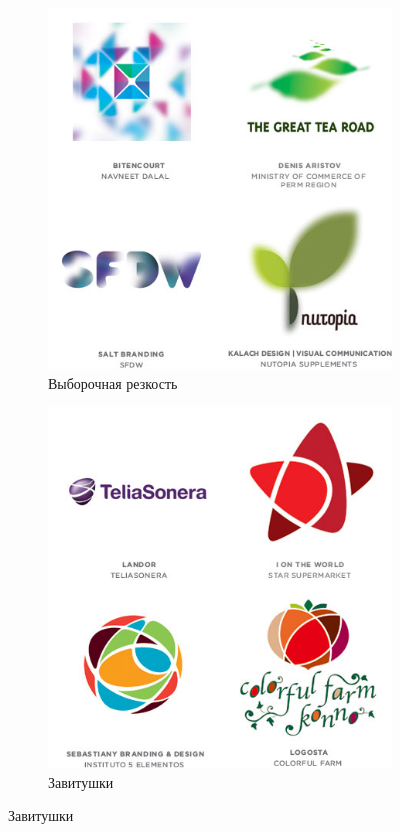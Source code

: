 \begin{figure}[h!]
  \ContinuedFloat
  \centering
  \begin{subfigure}{.45\textwidth}
    \centering
    \includegraphics[width=\linewidth]{images/supplement/logolounge/2012/Viborochnaya-rexkost'.jpeg}
    \caption[]{Выборочная резкость}
    \label{fig:logolounge:2012:viborichnaya-rexkost'}
  \end{subfigure}
  \hfill
  \centering
  \begin{subfigure}{.45\textwidth}
    \centering
    \includegraphics[width=\linewidth]{images/supplement/logolounge/2012/Zavitushki}
    \caption[]{Завитушки}
    \label{fig:logolounge:2012:zavitushki}
  \end{subfigure}


\end{figure}
